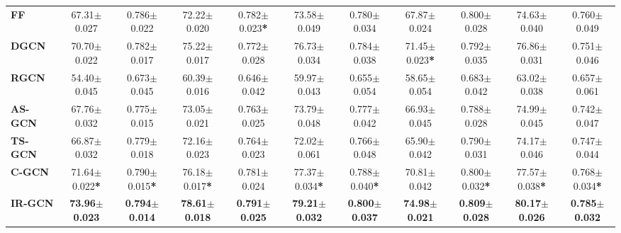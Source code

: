 \begin{table}[h]
\begin{threeparttable}
\begin{tabular}{l|c c|c c|c c|c c|c c}
     \textbf{FF~\cite{JendersKN16}} & 67.31$\pm$0.027 & 0.786$\pm$0.022 & 72.22$\pm$0.020 & 0.782$\pm$0.023\textbf{*} & 73.58$\pm$0.049 & 0.780$\pm$0.034 & 67.87$\pm$0.024 & 0.800$\pm$0.028 & 74.63$\pm$0.040 & 0.760$\pm$0.049\\
     \textbf{DGCN~\cite{DualGCN}} & 70.70$\pm$0.022 & 0.782$\pm$0.017 & 75.22$\pm$0.017 & 0.772$\pm$0.028 & 76.73$\pm$0.034 & 0.784$\pm$0.038 & 71.45$\pm$0.023\textbf{*} & 0.792$\pm$0.035 & 76.86$\pm$0.031 & 0.751$\pm$0.046 \\
     \textbf{RGCN~\cite{relationalGCN}} & 54.40$\pm$0.045 & 0.673$\pm$0.045 & 60.39$\pm$0.016 & 0.646$\pm$0.042 & 59.97$\pm$0.043 & 0.655$\pm$0.054 & 58.65$\pm$0.054 & 0.683$\pm$0.042 & 63.02$\pm$0.038 & 0.657$\pm$0.061\\
     \cmidrule(lr){1-1}\cmidrule(lr){2-11}%
     \textbf{AS-GCN} & 67.76$\pm$0.032 &0.775$\pm$0.015 & 73.05$\pm$0.021 & 0.763$\pm$0.025 &73.79$\pm$0.048 & 0.777$\pm$0.042 & 66.93$\pm$0.045 & 0.788$\pm$0.028 & 74.99$\pm$0.045 & 0.742$\pm$0.047 \\
     \textbf{TS-GCN} & 66.87$\pm$0.032 & 0.779$\pm$0.018 & 72.16$\pm$0.023 & 0.764$\pm$0.023 & 72.02$\pm$0.061 & 0.766$\pm$0.048 & 65.90$\pm$0.042 & 0.790$\pm$0.031 & 74.17$\pm$0.046 &0.747$\pm$0.044\\
     \textbf{C-GCN } & 71.64$\pm$0.022\textbf{*} & 0.790$\pm$0.015\textbf{*}& 76.18$\pm$0.017\textbf{*}& 0.781$\pm$0.024 & 77.37$\pm$0.034\textbf{*}& 0.788$\pm$0.040\textbf{*} & 70.81$\pm$0.042 & 0.800$\pm$0.032\textbf{*}& 77.57$\pm$0.038\textbf{*} & 0.768$\pm$0.034\textbf{*} \\
     \textbf{IR-GCN} & \textbf{73.96$\pm$0.023} & \textbf{0.794$\pm$0.014} & \bfseries 78.61$\pm$\bfseries0.018 & \bfseries 0.791$\pm$\bfseries 0.025 & \bfseries 79.21$\pm$\bfseries 0.032 & \bfseries 0.800$\pm$\bfseries 0.037 & \textbf{74.98$\pm$0.021} & \textbf{0.809$\pm$0.028} & \textbf{80.17$\pm$0.026} & \textbf{0.785$\pm$0.032} \\

\end{tabular}
\end{threeparttable}
\end{table}
